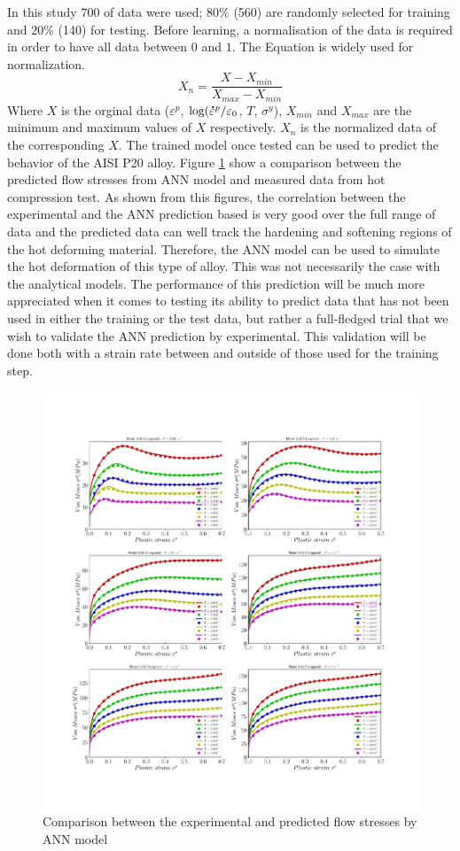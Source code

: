 \documentclass[twoside,english,1p,final,sort&compress]{elsarticle}
\theoremstyle{plain}
\newcommand{\mdot}[1]{\accentset{\mbox{\bfseries .}}{#1}}
\begin{document}
In this study $700$ of data were used; $80\%$ (560) are randomly selected for training and $20\%$ (140) for testing. Before learning, a normalisation of the data is required in order to have all data between $0$ and $1$. The Equation is widely used for normalization.
\begin{equation}
X_n = \frac{X - X_{min}}{X_{max} - X_{min}}
\end{equation}
Where $X$ is the orginal data ($\varepsilon^p$, $\log(\mdot\varepsilon^p/\varepsilon_0$,  $T$, $\sigma^y$), $X_{min}$ and $X_{max}$ are the minimum and maximum values of $X$ respectively. $X_n$ is the normalized data of the corresponding $X$. The trained model once tested can be used to predict the behavior of the AISI P20 alloy. Figure \ref{fig:iCorrelationANN} show a comparison between the predicted ﬂow stresses from ANN model and measured data from hot compression test. As shown from this figures, the correlation between the experimental and the ANN prediction based is very good over the full range of data and the predicted data can well track the hardening and softening regions of the hot deforming material. Therefore, the ANN model can be used to simulate the hot deformation of this type of alloy. This was not necessarily the case with the analytical models. The performance of this prediction will be much more appreciated when it comes to testing its ability to predict data that has not been used in either the training or the test data, but rather a full-fledged trial that we wish to validate the ANN prediction by experimental. This validation will be done both with a strain rate between and outside of those used for the training step.
\begin{figure}[!ht]
\centering
\includegraphics[width=1\columnwidth]
{Figures/CompExpANN}
\caption{Comparison between the experimental and predicted flow stresses by ANN model }
\label{fig:iCorrelationANN}
\end{figure}
\end{document}
